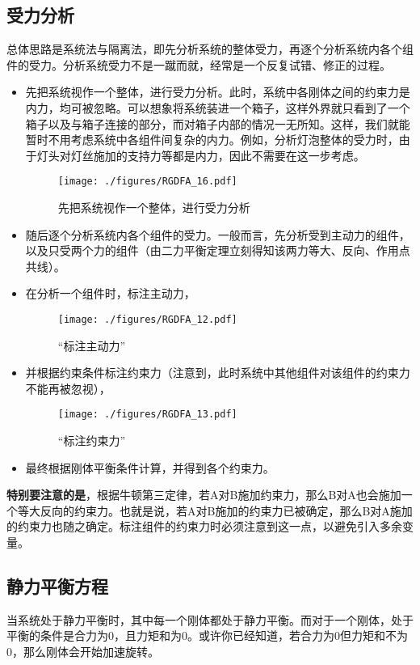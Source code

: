 \subsection{受力分析}
总体思路是系统法与隔离法，即先分析系统的整体受力，再逐个分析系统内各个组件的受力。分析系统受力不是一蹴而就，经常是一个反复试错、修正的过程。
\begin{itemize}
\item 先把系统视作一个整体，进行受力分析。此时，系统中各刚体之间的约束力是内力，均可被忽略。可以想象将系统装进一个箱子，这样外界就只看到了一个箱子以及与箱子连接的部分，而对箱子内部的情况一无所知。这样，我们就能暂时不用考虑系统中各组件间复杂的内力。例如，分析灯泡整体的受力时，由于灯头对灯丝施加的支持力等都是内力，因此不需要在这一步考虑。
\begin{figure}[ht]
\centering
\texttt{[image: ./figures/RGDFA\_16.pdf]}
\caption{先把系统视作一个整体，进行受力分析} \label{RGDFA_fig16}
\end{figure}

\item 随后逐个分析系统内各个组件的受力。一般而言，先分析受到主动力的组件，以及只受两个力的组件（由二力平衡定理立刻得知该两力等大、反向、作用点共线）。
\item 在分析一个组件时，标注主动力，
\begin{figure}[ht]
\centering
\texttt{[image: ./figures/RGDFA\_12.pdf]}
\caption{“标注主动力”} \label{RGDFA_fig12}
\end{figure}
\item 并根据约束条件标注约束力（注意到，此时系统中其他组件对该组件的约束力不能再被忽视），
\begin{figure}[ht]
\centering
\texttt{[image: ./figures/RGDFA\_13.pdf]}
\caption{“标注约束力”} \label{RGDFA_fig13}
\end{figure}
\item 最终根据刚体平衡条件计算，并得到各个约束力。
\end{itemize}

\textbf{特别要注意的是}，根据牛顿第三定律，若A对B施加约束力，那么B对A也会施加一个等大反向的约束力。也就是说，若A对B施加的约束力已被确定，那么B对A施加的约束力也随之确定。标注组件的约束力时必须注意到这一点，以避免引入多余变量。

\subsection{静力平衡方程}\label{RGDFA_sub1}
当系统处于静力平衡时，其中每一个刚体都处于静力平衡。而对于一个刚体，处于平衡的条件是合力为0，且力矩和为0。或许你已经知道，若合力为0但力矩和不为0，那么刚体会开始加速旋转。

